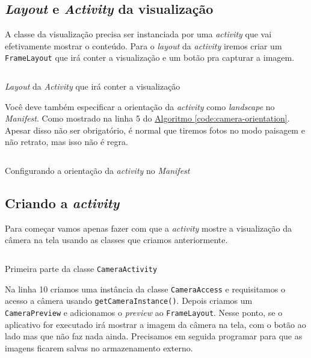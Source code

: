 \documentclass[a4paper,12pt,brazil,oneside]{book}
\begin{document}
\begin{singlespace}
	\subsection{\emph{Layout} e \emph{Activity} da visualização}

	A classe da visualização precisa ser instanciada por uma \emph{activity} que vai efetivamente mostrar o conteúdo. Para o \emph{layout} da \emph{activity} iremos criar um \texttt{FrameLayout} que irá conter a visualização e um botão pra capturar a imagem.

		\begin{listing}[H]
		\inputminted[linenos=true,fontsize=\small,frame=lines, framesep=2mm, tabsize=2,numbersep=5pt]{xml}{src/api/camera/camera-layout.xml}
		\caption{\emph{Layout} da \emph{Activity} que irá conter a visualização}
		\label{code:camera-layout}
		\end{listing} 	

	Você deve também especificar a orientação da \emph{activity} como \emph{landscape} no \emph{Manifest}. Como mostrado na linha 5 do \hyperref[code:camera-orientation]{Algoritmo \ref*{code:camera-orientation}}. Apesar disso não ser obrigatório, é normal que tiremos fotos no modo paisagem e não retrato, mas isso não é regra.

		\begin{listing}[H]
		\inputminted[linenos=true,fontsize=\small,frame=lines, framesep=2mm, tabsize=2,numbersep=5pt]{xml}{src/api/camera/camera-orientation.xml}
		\caption{Configurando a orientação da \emph{activity} no \emph{Manifest}}
		\label{code:camera-orientation}
		\end{listing} 	

	\subsection{Criando a \emph{activity}}

		Para começar vamos apenas fazer com que a \emph{activity} mostre a visualização da câmera na tela usando as classes que criamos anteriormente. 

		\begin{listing}[H]
		\inputminted[linenos=true,fontsize=\small,frame=lines, framesep=2mm, tabsize=2,numbersep=5pt]{java}{src/api/camera/camera-activity.java}
		\caption{Primeira parte da classe \texttt{CameraActivity}}
		\label{code:camera-activity}
		\end{listing} 			

		Na linha 10 criamos uma instância da classe \texttt{CameraAccess} e requisitamos o acesso a câmera usando \texttt{getCameraInstance()}. Depois criamos um \texttt{CameraPreview} e adicionamos o \emph{preview} ao \texttt{FrameLayout}. Nesse ponto, se o aplicativo for executado irá mostrar a imagem da câmera na tela, com o botão ao lado mas que não faz nada ainda. Precisamos em seguida programar para que as imagens ficarem salvas no armazenamento externo.


\end{singlespace}
\end{document}
